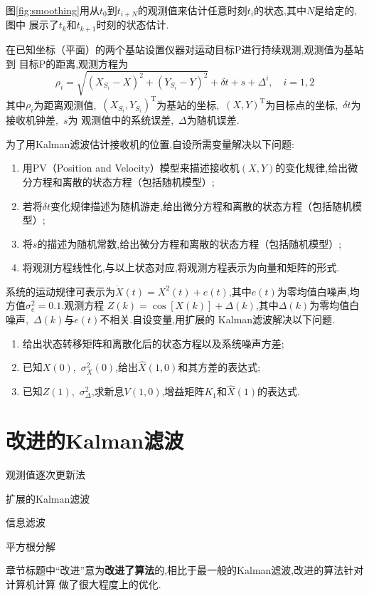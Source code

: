 \documentclass[cn,10pt,citestyle=gb7714-2015,bibstyle=gb7714-2015]{elegantbook}
\renewcommand{\emph}[1]{\textbf{#1}}%
\newcommand{\mT}{\mathrm{T}}
\begin{document}
图\ref{fig:smoothing}用从$t_0$到$t_{i+N}$的观测值来估计任意时刻$t_i$的状态,其中$N$是给定的,图中
展示了$t_k$和$t_{k+1}$时刻的状态估计.
\begin{problemset}
  \item 在已知坐标（平面）的两个基站设置仪器对运动目标P进行持续观测,观测值为基站到
  目标P的距离,观测方程为
  \[
    \rho_i=\sqrt{(X_{S_i}-X)^2+(Y_{S_i}-Y)^2}+\delta t+s+\varDelta^i,\quad i=1,2
  \]
  其中$\rho_i$为距离观测值,\ $(X_{S_i},Y_{S_i})^\mT$为基站的坐标,\ $(X,Y)^\mT$为目标点的坐标,\ $\delta t$为接收机钟差,\ $s$为
  观测值中的系统误差,\ $\varDelta$为随机误差.

  为了用Kalman滤波估计接收机的位置,自设所需变量解决以下问题:
  \begin{enumerate}
    \item 用\textup{PV}（Position and Velocity）模型来描述接收机$(X,Y)$的变化规律,给出微分方程和离散的状态方程（包括随机模型）;
    \item 若将$\delta t$变化规律描述为随机游走,给出微分方程和离散的状态方程（包括随机模型）;
    \item 将$s$的描述为随机常数,给出微分方程和离散的状态方程（包括随机模型）;
    \item 将观测方程线性化,与以上状态对应,将观测方程表示为向量和矩阵的形式.
  \end{enumerate}
  \item 系统的运动规律可表示为$\dot{X}(t)=X^2(t)+e(t)$,其中$e(t)$为零均值白噪声,均方值$\sigma_e^2=0.1$.观测方程
  $Z(k)=\cos[X(k)]+\varDelta(k)$,其中$\varDelta(k)$为零均值白噪声,\ $\varDelta(k)$与$e(t)$不相关.自设变量,用扩展的
  Kalman滤波解决以下问题.
  \begin{enumerate}
    \item 给出状态转移矩阵和离散化后的状态方程以及系统噪声方差;
    \item 已知$X(0)$,\ $\sigma_X^2(0)$,给出$\hat{X}(1,0)$和其方差的表达式;
    \item 已知$Z(1)$,\ $\sigma_{\varDelta}^2$,求新息$V(1,0)$,增益矩阵$K_1$和$\hat{X}(1)$的表达式.
  \end{enumerate}
\end{problemset}
\chapter{改进的\textup{Kalman}滤波}
\begin{introduction}
  \item 观测值逐次更新法
  \item 扩展的Kalman滤波
  \item 信息滤波
  \item 平方根分解
\end{introduction}
章节标题中“改进”意为\emph{改进了算法}的,相比于最一般的Kalman滤波,改进的算法针对计算机计算
做了很大程度上的优化.
\end{document}
